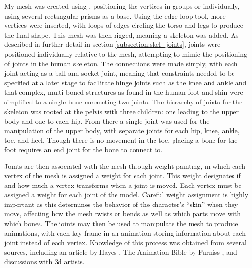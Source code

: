 My mesh was created using \maya{} \cite{maya}, positioning the vertices in groups or individually, using several rectangular prisms as a base.  Using the edge loop tool, more vertices were inserted, with loops of edges circling the torso and legs to produce the final shape.  This mesh was then rigged, meaning a skeleton was added.  As described in further detail in section \ref{subsection:skel_joints}, joints were positioned individually relative to the mesh, attempting to mimic the positioning of joints in the human skeleton.  The connections were made simply, with each joint acting as a ball and socket joint, meaning that constraints needed to be specified at a later stage to facilitate hinge joints such as the knee and ankle and that complex, multi-boned structures as found in the human foot and shin were simplified to a single bone connecting two joints.  The hierarchy of joints for the skeleton was rooted at the pelvis with three children: one leading to the upper body and one to each hip.  From there a single joint was used for the manipulation of the upper body, with separate joints for each hip, knee, ankle, toe, and heel.  Though there is no movement in the toe, placing a bone for the foot requires an end joint for the bone to connect to.

Joints are then associated with the mesh through weight painting, in which each vertex of the mesh is assigned a weight for each joint.  This weight designates if and how much a vertex transforms when a joint is moved.  Each vertex must be assigned a weight for each joint of the model.  Careful weight assignment is highly important as this determines the behavior of the character's ``skin'' when they move, affecting how the mesh twists or bends as well as which parts move with which bones.  The joints may then be used to manipulate the mesh to produce animations, with each key frame in an animation storing information about each joint instead of each vertex.  Knowledge of this process was obtained from several sources, including an article by Hayes \cite{gamasutra_char_anim}, The Animation Bible by Furniss \cite{anim_bible_ex}, and discussions with 3d artists.

